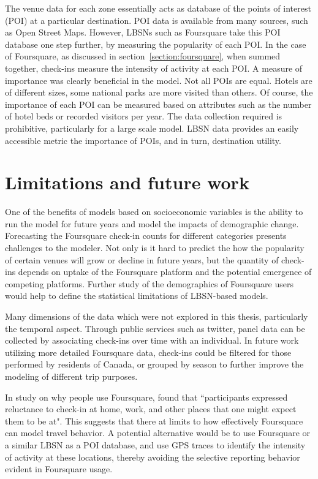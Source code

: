 The venue data for each zone essentially acts as database of the points of interest (POI) at a particular destination. POI data is available from many sources, such as Open Street Maps. However, LBSNs such as Foursquare take this POI database one step further, by measuring the popularity of each POI. In the case of Foursquare, as discussed in section~\ref{section:foursquare}, when summed together, check-ins measure the intensity of activity at each POI. A measure of importance was clearly beneficial in the model. Not all POIs are equal. Hotels are of different sizes, some national parks are more visited than others. Of course, the importance of each POI can be measured based on attributes such as the number of hotel beds or recorded visitors per year. The data collection required is prohibitive, particularly for a large scale model. LBSN data provides an easily accessible metric the importance of POIs, and in turn, destination utility. 

\section{Limitations and future work}
One of the benefits of models based on socioeconomic variables is the ability to run the model for future years and model the impacts of demographic change. Forecasting the Foursquare check-in counts for different categories presents challenges to the modeler. Not only is it hard to predict the how the popularity of certain venues will grow or decline in future years, but the quantity of check-ins depends on uptake of the Foursquare platform and the potential emergence of competing platforms. Further study of the demographics of Foursquare users would help to define the statistical limitations of LBSN-based models. 

Many dimensions of the data which were not explored in this thesis,  particularly the temporal aspect. Through public services such as twitter, panel data can be collected by associating check-ins over time with an individual. In future work utilizing more detailed Foursquare data, check-ins could be filtered for those performed by residents of Canada, or grouped by season to further improve the modeling of different trip purposes. 

In study on why people use Foursquare, \textcite{lindqvist2011m} found that ``participants expressed reluctance to check-in at home, work, and other places that one might expect them to be at". This suggests that there at limits to how effectively Foursquare can model travel behavior. A potential alternative would be to use Foursquare or a similar LBSN as a POI database, and use GPS traces to identify the intensity of activity at these locations, thereby avoiding the selective reporting behavior evident in Foursquare usage. 

